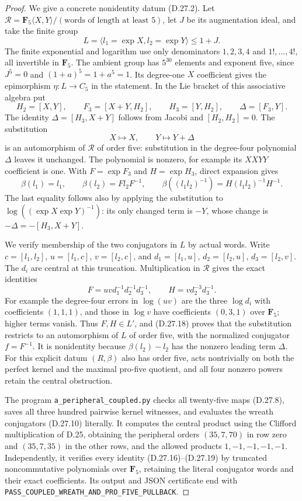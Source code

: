 \begin{proof}
We give a concrete nonidentity datum \textup{(D.27.2)}.
Let $\mathcal R=\mathbf F_5\langle X,Y\rangle/
(\text{words of length at least }5)$, let $J$ be its
augmentation ideal, and take the finite group
\[
 L=\langle l_1=\exp X,l_2=\exp Y\rangle\leq1+J.
 \tag{D.27.15}
\]
The finite exponential and logarithm use only denominators
$1,2,3,4$ and $1!,\ldots,4!$, all invertible in
$\mathbf F_5$.  The ambient group has $5^{30}$ elements
and exponent five, since $J^5=0$ and $(1+a)^5=1+a^5=1$.
Its degree-one $X$ coefficient gives the epimorphism
$\eta:L\to C_5$ in the statement.
In the Lie bracket of this associative algebra put
\[
 H_2=[X,Y],\qquad F_3=[X+Y,H_2],\qquad
 H_3=[Y,H_2],\qquad \Delta=[F_3,Y].
 \tag{D.27.16}
\]
The identity $\Delta=[H_3,X+Y]$ follows from Jacobi and
$[H_2,H_2]=0$.  The substitution
\[
             X\longmapsto X,\qquad Y\longmapsto Y+\Delta
 \tag{D.27.17}
\]
is an automorphism of $\mathcal R$ of order five: substitution
in the degree-four polynomial $\Delta$ leaves it unchanged.
The polynomial is nonzero, for example its $XXYY$ coefficient
is one.  With $F=\exp F_3$ and $H=\exp H_3$, direct expansion
gives
\[
 \beta(l_1)=l_1,\qquad
 \beta(l_2)=F l_2F^{-1},\qquad
 \beta((l_1l_2)^{-1})=H(l_1l_2)^{-1}H^{-1}.
 \tag{D.27.18}
\]
The last equality follows also by applying the substitution
to $\log((\exp X\exp Y)^{-1})$: its only changed term is
$-Y$, whose change is $-\Delta=-[H_3,X+Y]$.

We verify membership of the two conjugators in $L$ by actual
words.  Write $c=[l_1,l_2]$, $u=[l_1,c]$, $v=[l_2,c]$,
and $d_1=[l_1,u]$, $d_2=[l_2,u]$, $d_3=[l_2,v]$.
The $d_i$ are central at this truncation.  Multiplication
in $\mathcal R$ gives the exact identities
\[
       F=uvd_1^{-1}d_2^{-1}d_3^{-1},\qquad
       H=v d_2^{-3}d_3^{-1}.
 \tag{D.27.19}
\]
For example the degree-four errors in $\log(uv)$ are the
three $\log d_i$ with coefficients $(1,1,1)$, and those in
$\log v$ have coefficients $(0,3,1)$ over $\mathbf F_5$;
higher terms vanish.  Thus $F,H\in L'$, and
\textup{(D.27.18)} proves that the substitution restricts
to an automorphism of $L$ of order five, with the normalized
conjugator $f=F^{-1}$.  It is nonidentity because
$\beta(l_2)-l_2$ has the nonzero leading term $\Delta$.
For this explicit datum $(R,\beta)$ also has order five,
acts nontrivially on both the perfect kernel and the
maximal pro-five quotient, and all four nonzero powers
retain the central obstruction.

The program \texttt{a\_peripheral\_coupled.py} checks all
twenty-five maps \textup{(D.27.8)}, saves all three hundred
pairwise kernel witnesses, and evaluates the wreath
conjugators \textup{(D.27.10)} literally.  It computes the
central product using the Clifford multiplication of D.25,
obtaining the peripheral orders $(35,7,70)$ in row zero
and $(35,7,35)$ in the other rows, and the allowed products
$1,-1,-1,-1,-1$.  Independently, it verifies every identity
\textup{(D.27.16)--(D.27.19)} by truncated noncommutative
polynomials over $\mathbf F_5$, retaining the literal
conjugator words and their exact coefficients.  Its output
and JSON certificate end with
\texttt{PASS\_COUPLED\_WREATH\_AND\_PRO\_FIVE\_PULLBACK}.
\end{proof}
